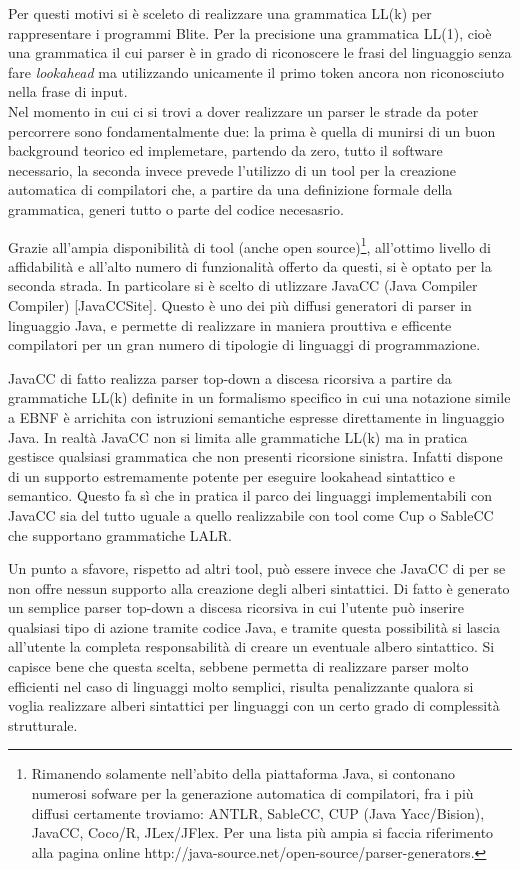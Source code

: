 Per questi motivi si è sceleto di realizzare una grammatica LL(k) per
rappresentare i programmi Blite. Per la precisione una grammatica LL(1), cioè
una grammatica il cui parser è in grado di riconoscere le frasi del linguaggio
senza fare \emph{lookahead} ma utilizzando unicamente il primo token ancora
non riconosciuto nella frase di input.
\\

Nel momento in cui ci si trovi a dover realizzare un parser le strade da poter
percorrere sono fondamentalmente due: la prima è quella di munirsi di un buon
background teorico ed implemetare, partendo da zero, tutto il software
necessario, la seconda invece prevede l'utilizzo di un tool per la creazione
automatica di compilatori che, a partire da una definizione formale della
grammatica, generi tutto o parte del codice necesasrio.

Grazie all'ampia disponibilità di tool (anche open source)\footnote{Rimanendo
solamente nell'abito della piattaforma Java, si contonano numerosi sofware per
la generazione automatica di compilatori, fra i più diffusi certamente troviamo:
ANTLR, SableCC, CUP (Java Yacc/Bision), JavaCC, Coco/R, JLex/JFlex. Per una
lista più ampia si faccia riferimento alla pagina online
http://java-source.net/open-source/parser-generators.}, all'ottimo livello di
affidabilità e all'alto numero di funzionalità offerto da questi, si è optato
per la seconda strada. In particolare si è scelto di utlizzare JavaCC (Java Compiler
Compiler) [JavaCCSite]. Questo è uno dei più diffusi generatori di
parser in linguaggio Java, e permette di realizzare in maniera prouttiva e
efficente compilatori per un gran numero di tipologie di linguaggi di
programmazione.

JavaCC di fatto realizza parser top-down a discesa ricorsiva a partire da
grammatiche LL(k) definite in un formalismo specifico in cui una notazione simile
a EBNF è arrichita con istruzioni semantiche espresse direttamente in linguaggio
Java. In realtà JavaCC non si limita alle grammatiche LL(k) ma in pratica
gestisce qualsiasi grammatica che non presenti ricorsione sinistra. Infatti
dispone di un supporto estremamente potente per eseguire lookahead sintattico e
semantico. Questo fa sì che in pratica il parco dei linguaggi implementabili con
JavaCC sia del tutto uguale a quello realizzabile con tool come Cup o SableCC che
supportano grammatiche LALR.

Un punto a sfavore, rispetto ad altri tool, può essere invece che JavaCC di per
se non offre nessun supporto alla creazione degli alberi sintattici. Di fatto
è generato un semplice parser top-down a discesa ricorsiva in cui l'utente può
inserire qualsiasi tipo di azione tramite codice Java, e tramite questa
possibilità si lascia all'utente la completa responsabilità di creare un
eventuale albero sintattico. Si capisce bene che questa scelta, sebbene permetta
di realizzare parser molto efficienti nel caso di linguaggi molto semplici,
risulta penalizzante qualora si voglia realizzare alberi sintattici per
linguaggi con un certo grado di complessità strutturale.

